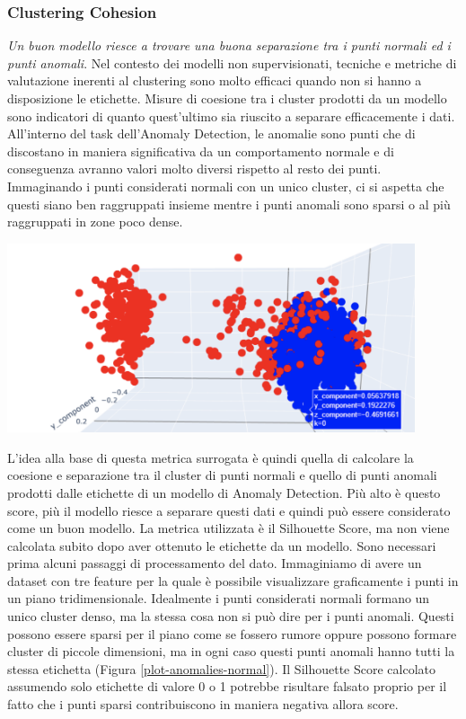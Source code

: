 \subsubsection{Clustering Cohesion}
\textit{Un buon modello riesce a trovare una buona separazione tra i punti normali ed i punti anomali}.
Nel contesto dei modelli non supervisionati, tecniche e metriche di valutazione inerenti al clustering sono molto efficaci quando non si hanno a disposizione le etichette. Misure di coesione tra i cluster prodotti da un modello sono indicatori di quanto quest'ultimo sia riuscito a separare efficacemente i dati.
All'interno del task dell'Anomaly Detection, le anomalie sono punti che di discostano in maniera significativa da un comportamento normale e di conseguenza avranno valori molto diversi rispetto al resto dei punti. Immaginando i punti considerati normali con un unico cluster, ci si aspetta che questi siano ben raggruppati insieme mentre i punti anomali sono sparsi o al più raggruppati in zone poco dense.
\begin{center}
	\includegraphics[width=12cm, scale=1]{images/plot-anomalies-normal}
    \captionsetup{type=figure}
    \label{plot-anomalies-normal}
\end{center}
L'idea alla base di questa metrica surrogata è quindi quella di calcolare la coesione e separazione tra il cluster di punti normali e quello di punti anomali prodotti dalle etichette di un modello di Anomaly Detection. Più alto è questo score, più il modello riesce a separare questi dati e quindi può essere considerato come un buon modello.
La metrica utilizzata è il Silhouette Score, ma non viene calcolata subito dopo aver ottenuto le etichette da un modello. Sono necessari prima alcuni passaggi di processamento del dato.
Immaginiamo di avere un dataset con tre feature per la quale è possibile visualizzare graficamente i punti in un piano tridimensionale. Idealmente i punti considerati normali formano un unico cluster denso, ma la stessa cosa non si può dire per i punti anomali. 
Questi possono essere sparsi per il piano come se fossero rumore oppure possono formare cluster di piccole dimensioni, ma in ogni caso questi punti anomali hanno tutti la stessa etichetta (Figura \ref{plot-anomalies-normal}).
Il Silhouette Score calcolato assumendo solo etichette di valore 0 o 1 potrebbe risultare falsato proprio per il fatto che i punti sparsi contribuiscono in maniera negativa allora score.

